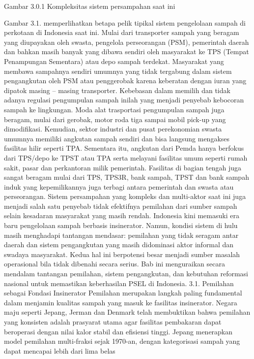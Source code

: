 \documentclass[
  letterpaper,
  DIV=11,
  numbers=noendperiod]{scrreprt}
\begin{document}
Gambar 3.0.1 Kompleksitas sistem persampahan saat ini

Gambar 3.1. memperlihatkan betapa pelik tipikal sistem pengelolaan
sampah di perkotaan di Indonesia saat ini. Mulai dari transporter sampah
yang beragam yang diupayakan oleh swasta, pengelola perseorangan (PSM),
pemerintah daerah dan bahkan masih banyak yang dibawa sendiri oleh
masyarakat ke TPS (Tempat Penampungan Sementara) atau depo sampah
terdekat. Masyarakat yang membawa sampahnya sendiri umumnya yang tidak
tergabung dalam sistem pengangkutan oleh PSM atau penggerobak karena
keberatan dengan iuran yang dipatok masing -- masing transporter.
Kebebasan dalam memilih dan tidak adanya regulasi pengumpulan sampah
inilah yang menjadi penyebab kebocoran sampah ke lingkungan. Moda alat
trasportasi pengumpulan sampah juga beragam, mulai dari gerobak, motor
roda tiga sampai mobil pick-up yang dimodifikasi. Kemudian, sektor
industri dan pusat perekonomian swasta umumnya memiliki angkutan sampah
sendiri dan bisa langsung mengakses fasilitas hilir seperti TPA.
Sementara itu, angkutan dari Pemda hanya berfokus dari TPS/depo ke TPST
atau TPA serta melayani fasilitas umum seperti rumah sakit, pasar dan
perkantoran milik pemerintah. Fasilitas di bagian tengah juga sangat
beragam mulai dari TPS, TPS3R, bank sampah, TPST dan bank sampah induk
yang kepemilikannya juga terbagi antara pemerintah dan swasta atau
perseorangan. Sistem persampahan yang kompleks dan multi-aktor saat ini
juga menjadi salah satu penyebab tidak efektifnya pemilahan dari sumber
sampah selain kesadaran masyarakat yang masih rendah. Indonesia kini
memasuki era baru pengelolaan sampah berbasis insinerator. Namun,
kondisi sistem di hulu masih menghadapi tantangan mendasar: pemilahan
yang tidak seragam antar daerah dan sistem pengangkutan yang masih
didominasi aktor informal dan swadaya masyarakat. Kedua hal ini
berpotensi besar menjadi sumber masalah operasional bila tidak dibenahi
secara serius. Bab ini menguraikan secara mendalam tantangan pemilahan,
sistem pengangkutan, dan kebutuhan reformasi nasional untuk memastikan
keberhasilan PSEL di Indonesia. 3.1. Pemilahan sebagai Fondasi
Insinerator Pemilahan merupakan langkah paling fundamental dalam
menjamin kualitas sampah yang masuk ke fasilitas insinerator. Negara
maju seperti Jepang, Jerman dan Denmark telah membuktikan bahwa
pemilahan yang konsisten adalah prasyarat utama agar fasilitas
pembakaran dapat beroperasi dengan nilai kalor stabil dan efisiensi
tinggi. Jepang menerapkan model pemilahan multi-fraksi sejak 1970-an,
dengan kategorisasi sampah yang dapat mencapai lebih dari lima belas
\end{document}
